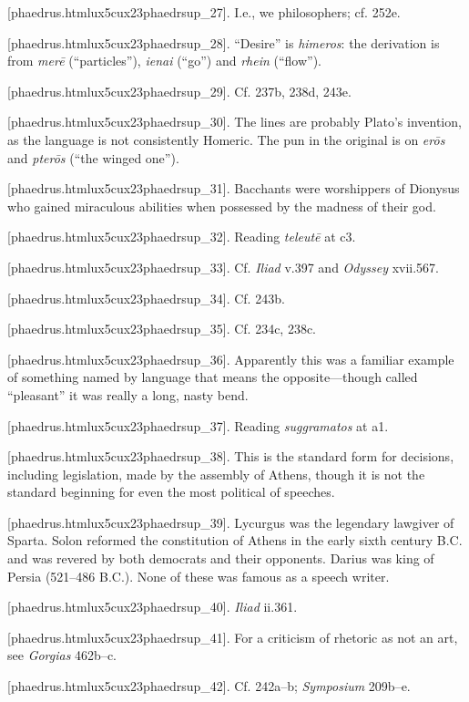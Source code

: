 [phaedrus.htmlux5cux23phaedrsup_27]. I.e., we philosophers; cf.
252e.

[phaedrus.htmlux5cux23phaedrsup_28]. “Desire” is {\em himeros}:
the derivation is from {\em merē} (“particles”), {\em ienai} (“go”) and
{\em rhein} (“flow”).

[phaedrus.htmlux5cux23phaedrsup_29]. Cf. 237b, 238d, 243e.

[phaedrus.htmlux5cux23phaedrsup_30]. The lines are probably
Plato's invention, as the language is not consistently Homeric. The pun
in the original is on {\em erōs} and {\em pterōs} (“the winged one”).

[phaedrus.htmlux5cux23phaedrsup_31]. Bacchants were worshippers
of Dionysus who gained miraculous abilities when possessed by the
madness of their god.

[phaedrus.htmlux5cux23phaedrsup_32]. Reading {\em teleutē} at
c3.

[phaedrus.htmlux5cux23phaedrsup_33]. Cf. {\em Iliad} v.397 and
{\em Odyssey} xvii.567.

[phaedrus.htmlux5cux23phaedrsup_34]. Cf. 243b.

[phaedrus.htmlux5cux23phaedrsup_35]. Cf. 234c, 238c.

[phaedrus.htmlux5cux23phaedrsup_36]. Apparently this was a
familiar example of something named by language that means the
opposite---though called “pleasant” it was really a long, nasty bend.

[phaedrus.htmlux5cux23phaedrsup_37]. Reading {\em suggramatos}
at a1.

[phaedrus.htmlux5cux23phaedrsup_38]. This is the standard form
for decisions, including legislation, made by the assembly of Athens,
though it is not the standard beginning for even the most political of
speeches.

[phaedrus.htmlux5cux23phaedrsup_39]. Lycurgus was the legendary
lawgiver of Sparta. Solon reformed the constitution of Athens in the
early sixth century B.C. and was revered by both democrats and their
opponents. Darius was king of Persia (521--486 B.C.). None of these was
famous as a speech writer.

[phaedrus.htmlux5cux23phaedrsup_40]. {\em Iliad} ii.361.

[phaedrus.htmlux5cux23phaedrsup_41]. For a criticism of
rhetoric as not an art, see {\em Gorgias} 462b--c.

[phaedrus.htmlux5cux23phaedrsup_42]. Cf. 242a--b;
{\em Symposium} 209b--e.

